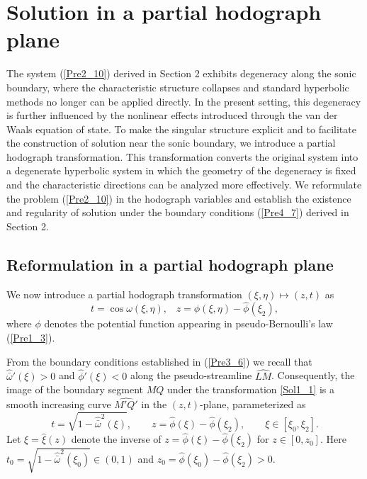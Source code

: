 \documentclass[3p,11pt]{elsarticle}
\numberwithin{equation}{section}
\begin{document}

\section{Solution in a partial hodograph plane}

The system (\ref{Pre2_10}) derived in Section 2 exhibits degeneracy along the sonic boundary, where the characteristic structure collapses and standard hyperbolic methods no longer can be applied directly. In the present setting, this degeneracy is further influenced by the nonlinear effects introduced through the van der Waals equation of state. To make the singular structure explicit and to facilitate the construction of solution near the sonic boundary, we introduce a partial hodograph transformation. This transformation converts the original system into a degenerate hyperbolic system in which the geometry of the degeneracy is fixed and the characteristic directions can be analyzed more effectively. We reformulate the problem (\ref{Pre2_10}) in the hodograph variables and establish the existence and regularity of solution under the boundary conditions (\ref{Pre4_7}) derived in Section 2.
 
\subsection{Reformulation in a partial hodograph plane}
We now introduce a partial hodograph transformation $(\xi,\eta) \mapsto (z,t)$ as 
\begin{equation}\label{Sol1_1}
    t=\cos\omega(\xi,\eta), \;\;\;z=\phi(\xi,\eta)-\hat\phi(\xi_2),
\end{equation}
where $\phi$ denotes the potential function appearing in pseudo-Bernoulli’s law (\ref{Pre1_3}).

From the boundary conditions established in (\ref{Pre3_6}) we recall that $\hat{\bar\omega}'(\xi)>0$ and $\hat\phi'(\xi)<0$ along the pseudo-streamline $\widehat{LM}$. Consequently, the image of the boundary segment $\widehat{MQ}$ under the transformation \eqref{Sol1_1} is a smooth increasing curve $\widehat{M'Q'}$ in the $(z,t)$-plane, parameterized as
\begin{equation}\label{Sol1_2}
    t=\sqrt{1-\hat{\bar\omega}^2(\xi)},\qquad 
    z=\hat\phi(\xi)-\hat\phi(\xi_2),
    \qquad \xi\in[\xi_0,\xi_2].
\end{equation}
 Let $\xi=\hat\xi(z)$ denote the inverse of $z=\hat\phi(\xi)-\hat\phi(\xi_2)$ for $z\in[0,z_0]$. Here $t_0=\sqrt{1-\hat{\bar\omega}^2(\xi_0)}\in(0,1)$ and $z_0=\hat\phi(\xi_0)-\hat\phi(\xi_2)>0$.
\end{document}

